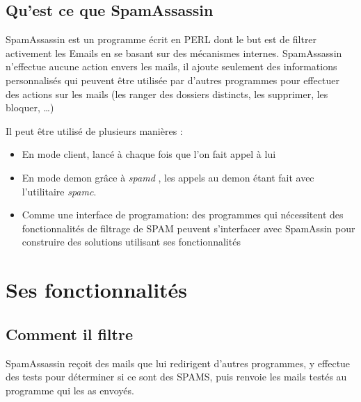 \documentclass[a4paper,11pt]{article}
\begin{document}
\subsection{Qu'est ce que SpamAssassin}

SpamAssassin est un programme écrit en PERL dont le but est de filtrer activement les Emails en se basant sur des mécanismes internes. 
SpamAssassin n'effectue aucune action envers les mails, il ajoute seulement des informations personnalisés
qui peuvent être utilisée par d'autres programmes pour effectuer des actions sur les mails (les ranger des dossiers distincts, les supprimer, les bloquer, \dots)


Il peut être utilisé de plusieurs manières :
\begin{itemize}
 \item En mode client, lancé à chaque fois que l'on fait appel à lui
 \item En mode demon grâce à \emph{spamd} , les appels au demon étant fait avec l'utilitaire \emph{spamc}.
 \item Comme une interface de programation: des programmes qui nécessitent des fonctionnalités de filtrage de SPAM peuvent s'interfacer avec SpamAssin
 pour construire des solutions utilisant ses fonctionnalités
\end{itemize}

\pagebreak

\section{Ses fonctionnalités}

\subsection{Comment il filtre}

SpamAssassin reçoit des mails que lui redirigent d'autres programmes, y effectue des tests pour déterminer si ce sont des SPAMS, 
puis renvoie les mails testés au programme qui les as envoyés.
\end{document}
